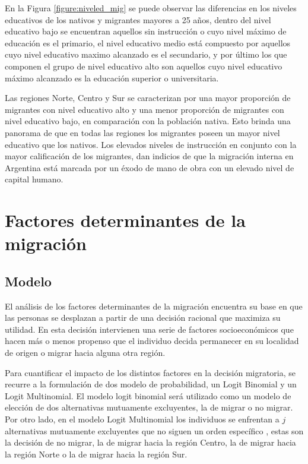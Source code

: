 \documentclass[12pt,a4paper]{article}
\begin{document}
En la Figura \ref{figure:niveled_mig} se puede observar las diferencias en los niveles educativos de los nativos y migrantes mayores a 25 años, dentro del nivel educativo bajo se encuentran aquellos sin instrucción o cuyo nivel máximo de educación es el primario, el nivel educativo medio está compuesto por aquellos cuyo nivel educativo maximo alcanzado es el secundario, y por último los que componen el grupo de nivel educativo alto son aquellos cuyo nivel educativo máximo alcanzado es la educación superior o universitaria.

Las regiones Norte, Centro y Sur se caracterizan por una mayor proporción de migrantes con nivel educativo alto y una menor proporción de migrantes con nivel educativo bajo, en comparación con la población nativa. Esto brinda una panorama de que en todas las regiones los migrantes poseen un mayor nivel educativo que los nativos. Los elevados niveles de instrucción en conjunto con la mayor calificación de los migrantes, dan indicios de que la migración interna en Argentina está marcada por un éxodo de mano de obra con un elevado nivel de capital humano.


\newpage
\section{Factores determinantes de la migración}
\subsection{Modelo}
El análisis de los factores determinantes de la migración  encuentra su base en que las personas se desplazan a partir de una decisión racional que maximiza su utilidad. En esta decisión intervienen una serie de factores socioeconómicos que hacen más o menos propenso que el individuo decida permanecer en su localidad de origen o migrar hacia alguna otra región.

Para cuantificar el impacto de los distintos factores en la decisión migratoria, se recurre a la formulación de dos modelo de probabilidad, un Logit Binomial y un Logit Multinomial. El modelo logit binomial será utilizado como un modelo de elección de dos alternativas mutuamente excluyentes, la de migrar o no migrar. Por otro lado, en el modelo Logit Multinomial los individuos se enfrentan a $j$ alternativas mutuamente excluyentes que no siguen un orden específico \parencite{greene_econometric_2018}, estas son la decisión de no migrar, la de migrar hacia la región Centro, la de migrar hacia la región Norte o la de migrar hacia la región Sur.
\end{document}
